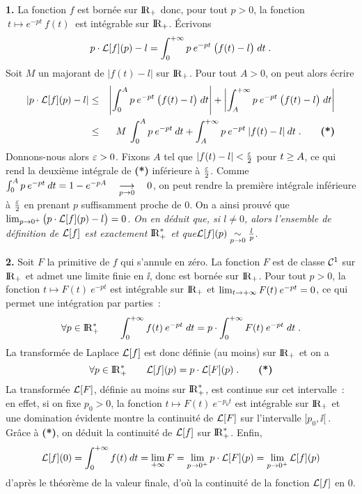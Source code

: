 \documentclass{article}
\begin{document}
\msk
\cl{- - - - - - - - - - - - - - - - - - - - - - - - - - - - - -}
\msk

{\bf 1.} La fonction $f$ est born\'ee sur ${\rm I\kern-0.6mm R}_+$ donc, pour tout $p>0$, la fonction $\>t\mapsto e^{-pt}\>f(t)\>$ est int\'egrable sur ${\rm I\kern-0.6mm R}_+$. \'Ecrivons\vv
$$p\cdot{\cal L}[f](p)-l=\int_0^{+\infty}p\>e^{-pt}\>\big(f(t)-l\big)\;dt\;.$$
Soit $M$ un majorant de $|f(t)-l|$ sur ${\rm I\kern-0.6mm R}_+$. Pour tout $A>0$, on peut alors \'ecrire\vv
\begin{eqnarray*}
|p\cdot{\cal L}[f](p)-l| & \leq & \left|\int_0^Ap\>e^{-pt}\>\big(f(t)-l\big)\;dt\right|+\left|\int_A^{+\infty}p\>e^{-pt}\>\big(f(t)-l\big)\;dt\right|\\
& \leq & M\>\int_0^A p\>e^{-pt}\>dt+\int_A^{+\infty}p\>e^{-pt}\>|f(t)-l|\>dt\;.\qquad\hbox{\bf (*)}
\end{eqnarray*}
\sect
Donnons-nous alors $\varepsilon>0$. Fixons $A$ tel que $|f(t)-l|<{\varepsilon\over2}$ pour $t\geq A$, ce qui rend la deuxi\`eme int\'egrale de {\bf (*)} inf\'erieure \`a ${\varepsilon\over2}$. Comme $\int_0^A p\>e^{-pt}\>dt=1-e^{-pA}\Vers{p}{0}0$, on peut rendre la premi\`ere int\'egrale inf\'erieure \`a ${\varepsilon\over2}$ en prenant $p$ suffisamment proche de $0$. On a ainsi prouv\'e que $\lim_{p\rightarrow0^+}\big(p\cdot{\cal L}[f](p)-l\big)=0$.\msk
{\it On en d\'eduit que, si $l\not=0$, alors l'ensemble de d\'efinition de ${\cal L}[f]$ est exactement ${\rm I\kern-0.6mm R}_+^*$ et que\break$\lap{f}(p)
\equi_{p\vers0}{l\s p}$}.

\msk
{\bf 2.} Soit $F$ la primitive de $f$ qui s'annule en z\'ero. La fonction
$F$ est de classe ${\cal C}^1$ sur ${\rm I\kern-0.6mm R}_+$ et admet une limite finie en $\ii$, donc est born\'ee sur ${\rm I\kern-0.6mm R}_+$.
Pour tout $p>0$, la fonction $t\mapsto F(t)\>e^{-pt}$ est int\'egrable sur ${\rm I\kern-0.6mm R}_+$ et $\lim_{t\rightarrow+\infty}F(t)\>e^{-pt}=0$, ce qui permet une int\'egration par parties~:
$$\forall p\in{\rm I\kern-0.6mm R}_+^*\qquad\int_0^{+\infty}f(t)\>e^{-pt}\;dt=p\cdot\int_0^{+\infty}F(t)\>e^{-pt}\;dt\;.$$
La transform\'ee de Laplace ${\cal L}[f]$ est donc d\'efinie (au moins) sur ${\rm I\kern-0.6mm R}_+$ et on a\vv
$$\forall p\in{\rm I\kern-0.6mm R}_+^*\qquad {\cal L}[f](p)=p\cdot{\cal L}[F](p)\;.\qquad\hbox{\bf (*)}$$
La transform\'ee ${\cal L}[F]$, d\'efinie au moins sur ${\rm I\kern-0.6mm R}_+^*$, est continue sur cet intervalle~: en effet, si on fixe $p_0>0$, la fonction $t\mapsto F(t)\>e^{-p_0t}$ est int\'egrable sur ${\rm I\kern-0.6mm R}_+$ et une domination \'evidente montre la continuit\'e de ${\cal L}[F]$ sur l'intervalle $[p_0,\ii[\>$. Gr\^ace \`a {\bf (*)}, on d\'eduit la continuit\'e de ${\cal L}[f]$ sur ${\rm I\kern-0.6mm R}_+^*$. Enfin,\vv
$${\cal L}[f](0)=\int_0^{+\infty}f(t)\>dt=\lim_{+\infty}F=\lim_{p\rightarrow0^+}p\cdot{\cal L}[F](p)=\lim_{p\rightarrow0^+}{\cal L}[f](p)$$
d'apr\`es le th\'eor\`eme de la valeur finale, d'o\`u la continuit\'e de la fonction ${\cal L}[f]$ en 0.
\end{document}

